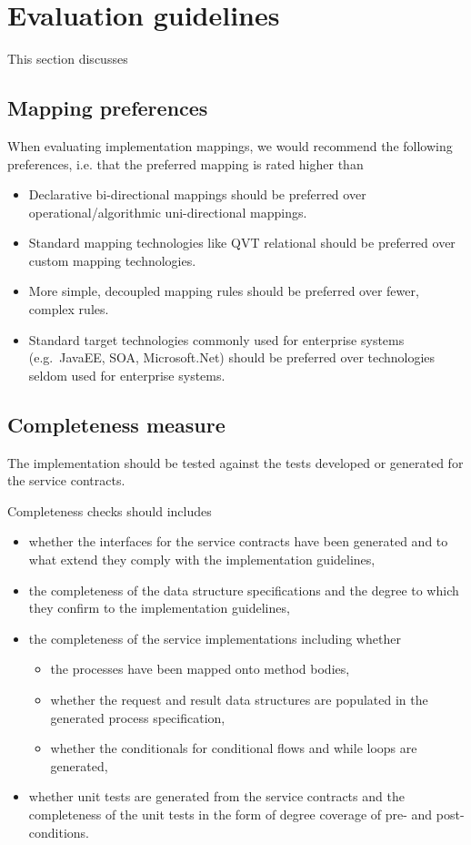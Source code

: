 \section{Evaluation guidelines}

This section discusses 

\subsection{Mapping preferences}

When evaluating implementation mappings, we would recommend the following preferences, i.e. that the preferred mapping is rated higher than 
\begin{itemize}
  \item Declarative bi-directional mappings should be preferred over operational/algorithmic uni-directional mappings. 
  \item Standard mapping technologies like QVT relational should be preferred over custom mapping technologies.
  \item More simple, decoupled mapping rules should be preferred over fewer, complex rules.
  \item Standard target technologies commonly used for enterprise systems (e.g.\ JavaEE, SOA, Microsoft.Net) should be preferred over technologies seldom used for enterprise systems.
\end{itemize}

\subsection{Completeness measure}
The implementation should be tested against the tests developed or generated for the service contracts. 

Completeness checks should includes
\begin{itemize}
  \item whether the interfaces for the service contracts have been generated and to what extend they comply with the implementation guidelines,
  \item the completeness of the data structure specifications and the degree to which they confirm to the implementation guidelines,
  \item the completeness of the service implementations including whether
    \begin{itemize}
     \item the processes have been mapped onto method bodies,
     \item whether the request and result data structures are populated in the generated process specification,
     \item whether the conditionals for conditional flows and while loops are generated,
    \end{itemize}
  \item whether unit tests are generated from the service contracts and the completeness of the unit tests in the form of degree coverage of pre- and post-conditions.
\end{itemize}

